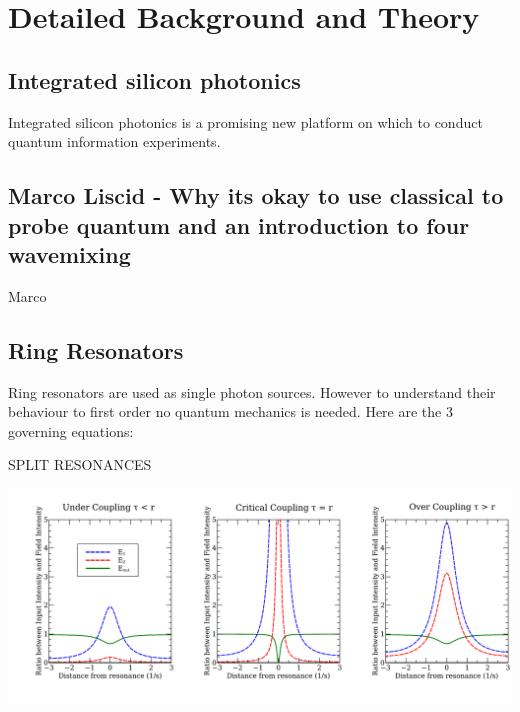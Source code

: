 \newpage
\section{Detailed Background and Theory}
\subsection{Integrated silicon photonics}
Integrated silicon photonics is a promising new platform on which to conduct quantum information experiments. 
\subsection{Marco Liscid - Why its okay to use classical to probe quantum and an introduction to four wavemixing}
Marco \cite{helt_how_2012}
\subsection{Ring Resonators}
Ring resonators are used as single photon sources. However to understand their behaviour to first order no quantum mechanics is needed. Here are the 3 governing equations:

SPLIT RESONANCES

\begingroup
    \centering  
    \includegraphics[width=18cm]{img/theory/coupling.pdf}
     \vspace{3pt} \label{crossCompare}
\endgroup

